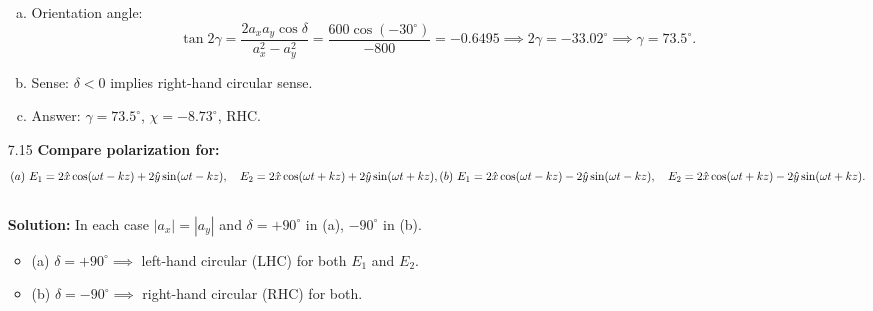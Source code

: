 \begin{enumerate}
\begin{enumerate}[(a)]
  \item Orientation angle:
  \[\tan2\gamma=\frac{2a_xa_y\cos\delta}{a_x^2-a_y^2}
    =\frac{600\cos(-30^\circ)}{-800}=-0.6495
    \implies2\gamma=-33.02^\circ\implies\gamma=73.5^\circ.\]

  \item Sense: $\delta<0$ implies right-hand circular sense.

  \item Answer: $\gamma=73.5^\circ$, $\chi=-8.73^\circ$, RHC.
\end{enumerate}

\item[7.15] \textbf{Compare polarization for:}
\[
  (a)~E_1=2\hat x\cos(\omega t-kz)+2\hat y\sin(\omega t-kz),\quad
       E_2=2\hat x\cos(\omega t+kz)+2\hat y\sin(\omega t+kz),\\
  (b)~E_1=2\hat x\cos(\omega t-kz)-2\hat y\sin(\omega t-kz),\quad
       E_2=2\hat x\cos(\omega t+kz)-2\hat y\sin(\omega t+kz).
\]
\\
\textbf{Solution:}
In each case $|a_x|=|a_y|$ and $\delta=+90^\circ$ in (a), $-90^\circ$ in (b).
\begin{itemize}
  \item (a) $\delta=+90^\circ\implies$ left-hand circular (LHC) for both $E_1$ and $E_2$.
  \item (b) $\delta=-90^\circ\implies$ right-hand circular (RHC) for both.
\end{itemize}

\end{enumerate}

